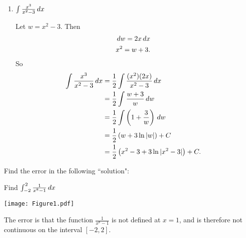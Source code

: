 \documentclass[handout,nooutcomes]{ximera}
\begin{document}
\begin{problem}
\begin{multicols}{2}
\begin{enumerate}
		
		
	\item  $\int \frac{x^3}{x^2 - 3} \,d x$
		\begin{freeResponse}
		Let $w = x^2 - 3$.  Then
			\begin{align*}
			&\,d w = 2x \,d x  \\
			&x^2 = w + 3.
			\end{align*}
		So
			\begin{align*}
			\int \frac{x^3}{x^2 - 3} \,d x &= \frac{1}{2} \int \frac{(x^2)(2x)}{x^2 - 3} \,d x  \\
			&= \frac{1}{2} \int \frac{w+3}{w} \,d w  \\
			&= \frac{1}{2} \int \left(1 + \frac{3}{w} \right) \,d w  \\
			&= \frac{1}{2} \left( w + 3 \ln|w| \right) + C  \\
			&= \frac{1}{2} \left( x^2 - 3 + 3\ln|x^2-3| \right) + C.
			\end{align*}
		\end{freeResponse}
		
		
		
	\end{enumerate}
	\end{multicols}
			
			
	
\end{problem}







\begin{problem}
Find the error in the following ``solution":

Find $\int_{-2}^2 \frac{1}{x^8 - 1} \,d x$

	\begin{image}
	\texttt{[image: Figure1.pdf]}
	\end{image}

	\begin{freeResponse}
	The error is that the function $\frac{1}{x^8-1}$ is not defined at $x=1$, and is therefore not continuous on the interval $[-2,2]$.
	\end{freeResponse}

\end{problem}








	
	
	
	
	
	
	
	
	

	










								
				
				
	
\end{document}
